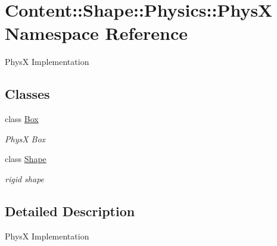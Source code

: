 \hypertarget{namespaceContent_1_1Shape_1_1Physics_1_1PhysX}{
\section{Content::Shape::Physics::PhysX Namespace Reference}
\label{namespaceContent_1_1Shape_1_1Physics_1_1PhysX}
}


PhysX Implementation  
\subsection*{Classes}
\begin{DoxyCompactItemize}
\item 
class \hyperlink{classContent_1_1Shape_1_1Physics_1_1PhysX_1_1Box}{Box}
\begin{DoxyCompactList}\small\item\em PhysX Box \item\end{DoxyCompactList}\item 
class \hyperlink{classContent_1_1Shape_1_1Physics_1_1PhysX_1_1Shape}{Shape}
\begin{DoxyCompactList}\small\item\em rigid shape \item\end{DoxyCompactList}\end{DoxyCompactItemize}


\subsection{Detailed Description}
PhysX Implementation 